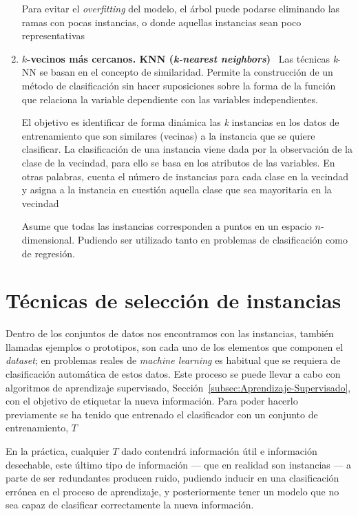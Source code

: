 \begin{enumerate}
	Para evitar el \textit{overfitting} del modelo, el árbol puede podarse eliminando las ramas con pocas instancias, o donde aquellas instancias sean poco representativas~\cite{palmer2011data}
	
	\item \textbf{$k$-vecinos más cercanos. KNN (\textit{k-nearest neighbors})}~\cite{guo2003knn,hand2007principles,palmer2011data} Las técnicas \textit{k}-NN se basan en el concepto de similaridad. Permite la construcción de un método de clasificación sin hacer suposiciones sobre la forma de la función que relaciona la variable dependiente con las variables independientes.
	
	El objetivo es identificar de forma dinámica las \textit{k} instancias en los datos de entrenamiento que son similares (vecinas) a la instancia que se quiere clasificar. La clasificación de una instancia viene dada por la observación de la clase de la vecindad, para ello se basa en los atributos de las variables. En otras palabras, cuenta el número de instancias para cada clase en la vecindad y asigna a la instancia en cuestión aquella clase que sea mayoritaria en la vecindad~\cite{potomac1999introduction}
	
	Asume que todas las instancias corresponden a puntos en un espacio $n$-dimensional. Pudiendo ser utilizado tanto en problemas de clasificación como de regresión.
\end{enumerate}

\section{Técnicas de selección de instancias}\label{sec:tecnicas-seleccion-instancias}
Dentro de los conjuntos de datos nos encontramos con las instancias, también llamadas ejemplos o prototipos, son cada uno de los elementos que componen el \textit{dataset}; en problemas reales de \textit{machine learning} es habitual que se requiera de clasificación automática de estos datos. Este proceso se puede llevar a cabo con algoritmos de aprendizaje supervisado, Sección~\ref{subsec:Aprendizaje-Supervisado}, con el objetivo de etiquetar la nueva información. Para poder hacerlo previamente se ha tenido que entrenado el clasificador con un conjunto de entrenamiento, $T$~\cite{olvera2010review}

En la práctica, cualquier $T$ dado contendrá información útil e información desechable, este último tipo de información --- que en realidad son instancias --- a parte de ser redundantes producen ruido, pudiendo inducir en una clasificación errónea en el proceso de aprendizaje, y posteriormente tener un modelo que no sea capaz de clasificar correctamente la nueva información.

